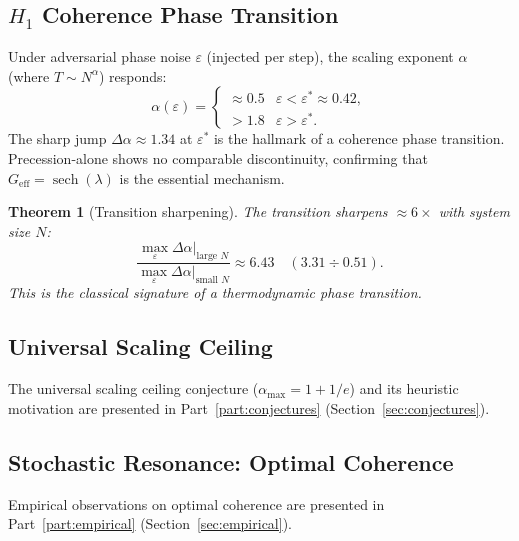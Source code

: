 \documentclass[12pt,a4paper]{article}
\theoremstyle{plain}
\newtheorem{theorem}{Theorem}[section]
\theoremstyle{definition}
\theoremstyle{remark}
\begin{document}
\subsection{$H_1$ Coherence Phase Transition}

Under adversarial phase noise $\varepsilon$ (injected per step), the scaling
exponent $\alpha$ (where $T\sim N^\alpha$) responds:
\begin{equation}
  \alpha(\varepsilon) =
  \begin{cases}
    \approx 0.5 & \varepsilon < \varepsilon^* \approx 0.42,\\
    > 1.8       & \varepsilon > \varepsilon^*.
  \end{cases}
  \label{eq:phase-transition}
\end{equation}
The sharp jump $\Delta\alpha \approx 1.34$ at $\varepsilon^*$ is the
hallmark of a coherence phase transition.  Precession-alone shows no
comparable discontinuity, confirming that $G_{\mathrm{eff}} = \operatorname{sech}(\lambda)$
is the essential mechanism.

\begin{theorem}[Transition sharpening]\label{thm:sharpening}
  The transition sharpens $\approx 6\times$ with system size $N$:
  \begin{equation}
    \frac{\max_\varepsilon \Delta\alpha\big|_{\text{large }N}}
         {\max_\varepsilon \Delta\alpha\big|_{\text{small }N}}
    \approx 6.43
    \quad (3.31 \div 0.51).
    \label{eq:sharpening}
  \end{equation}
  This is the classical signature of a thermodynamic phase transition.
\end{theorem}

\subsection{Universal Scaling Ceiling}

The universal scaling ceiling conjecture ($\alpha_{\max}=1+1/e$) and its
heuristic motivation are presented in
Part~\ref{part:conjectures} (Section~\ref{sec:conjectures}).

\subsection{Stochastic Resonance: Optimal Coherence}

Empirical observations on optimal coherence are presented in
Part~\ref{part:empirical} (Section~\ref{sec:empirical}).
\end{document}
